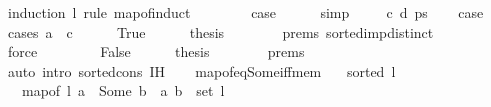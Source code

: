 \begin{isabellebody}
\isamarkupfalse%
\ {\isacharparenleft}{\kern0pt}induction\ l\ rule{\isacharcolon}{\kern0pt}\ map{\isacharunderscore}{\kern0pt}of{\isachardot}{\kern0pt}induct{\isacharparenright}{\kern0pt}\isanewline
\ \ \isamarkupfalse%
\ {}\isanewline
\ \ \isamarkupfalse%
\ {\isacharquery}{\kern0pt}case\isanewline
\ \ \ \ \isamarkupfalse%
\ simp\isanewline
{}\isamarkupfalse%
\isanewline
\ \ \isamarkupfalse%
\ {\isacharparenleft}{\kern0pt}{}\ c\ d\ ps{\isacharparenright}{\kern0pt}\isanewline
\ \ \isamarkupfalse%
\ {\isacharquery}{\kern0pt}case\isanewline
\ \ \isamarkupfalse%
\ {\isacharparenleft}{\kern0pt}cases\ {\isachardoublequoteopen}a\ {\isacharequal}{\kern0pt}\ c{\isachardoublequoteclose}{\isacharparenright}{\kern0pt}\isanewline
\ \ \ \ \isamarkupfalse%
\ True\isanewline
\ \ \ \ \isamarkupfalse%
\ {\isacharquery}{\kern0pt}thesis\isanewline
\ \ \ \ \ \ \isamarkupfalse%
\ {\isachardoublequoteopen}{}{\isachardot}{\kern0pt}prems{\isachardoublequoteclose}\ sorted{\isacharunderscore}{\kern0pt}imp{\isacharunderscore}{\kern0pt}distinct\isanewline
\ \ \ \ \ \ \isamarkupfalse%
\ force\isanewline
\ \ \isamarkupfalse%
\isanewline
\ \ \ \ \isamarkupfalse%
\ False\isanewline
\ \ \ \ \isamarkupfalse%
\ {\isacharquery}{\kern0pt}thesis\isanewline
\ \ \ \ \ \ \isamarkupfalse%
\ {\isachardoublequoteopen}{}{\isachardot}{\kern0pt}prems{\isachardoublequoteclose}\isanewline
\ \ \ \ \ \ \isamarkupfalse%
\ {\isacharparenleft}{\kern0pt}auto\ intro{\isacharcolon}{\kern0pt}\ sorted{\isacharunderscore}{\kern0pt}cons\ {\isachardoublequoteopen}{}{\isachardot}{\kern0pt}IH{\isachardoublequoteclose}{\isacharparenright}{\kern0pt}\isanewline
\ \ \isamarkupfalse%
\isanewline
{}\isamarkupfalse%
%
\endisatagproof
{\isafoldproof}%
%
\isadelimproof
\isanewline
%
\endisadelimproof
\isanewline
{}\isamarkupfalse%
\ map{\isacharunderscore}{\kern0pt}of{\isacharunderscore}{\kern0pt}eq{\isacharunderscore}{\kern0pt}Some{\isacharunderscore}{\kern0pt}iff{\isacharunderscore}{\kern0pt}mem{\isacharcolon}{\kern0pt}\isanewline
\ \ \ {\isachardoublequoteopen}sorted{}\ l{\isachardoublequoteclose}\isanewline
\ \ \ {\isachardoublequoteopen}map{\isacharunderscore}{\kern0pt}of\ l\ a\ {\isacharequal}{\kern0pt}\ Some\ b\ {\isasymlongleftrightarrow}\ {\isacharparenleft}{\kern0pt}a{\isacharcomma}{\kern0pt}\ b{\isacharparenright}{\kern0pt}\ {\isasymin}\ set\ l{\isachardoublequoteclose}\isanewline

\end{isabellebody}
